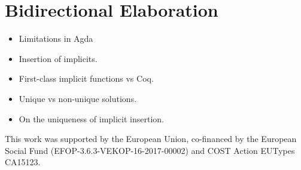 \documentclass[acmsmall,review,anonymous]{acmart}\settopmatter{printfolios=true,printccs=false,printacmref=false}
\begin{document}
\section{Bidirectional Elaboration}

\begin{itemize}
\item Limitations in Agda

\item Insertion of implicits.

\item First-class implicit functions vs Coq.

\item Unique vs non-unique solutions.

\item On the uniqueness of implicit insertion.
\end{itemize}






\begin{acks}
  This work was supported by the European Union, co-financed by the
  European Social Fund (EFOP-3.6.3-VEKOP-16-2017-00002) and COST Action
  EUTypes CA15123.
\end{acks}



\end{document}
